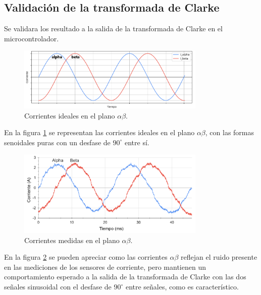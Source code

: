 \documentclass[11pt]{report}
\begin{document}
\newpage
\subsection{Validación de la transformada de Clarke}

Se validara los resultado a la salida de la transformada de Clarke en el microcontrolador.

\begin{figure}[ht]
	\centering
	\includegraphics[width=0.8\textwidth]{imagenes/graficas/Corrientes_AlphaBeta_ideal.png}
	\caption{Corrientes ideales en el plano $\alpha\beta$.}
	\label{corrientes_alpha_beta_ideal}
\end{figure}
\FloatBarrier

En la figura \ref{corrientes_alpha_beta_ideal} se representan las corrientes ideales en el plano $\alpha\beta$, con las formas senoidales puras con un desfase de $90^\circ$ entre sí.

\begin{figure}[ht]
	\centering
	\includegraphics[width=0.8\textwidth]{imagenes/graficas/Corrientes_AlphaBeta.png}
	\caption{Corrientes medidas en el plano $\alpha\beta$.}
	\label{corrientes_alpha_beta}
\end{figure}
\FloatBarrier

En la figura \ref{corrientes_alpha_beta} se pueden apreciar como las corrientes $\alpha\beta$ reflejan el ruido presente en las mediciones de los sensores de corriente, pero mantienen un comportamiento esperado a la salida de la transformada de Clarke con las dos señales sinusoidal con el desfase de $90^\circ$ entre señales, como es característico.
\end{document}
